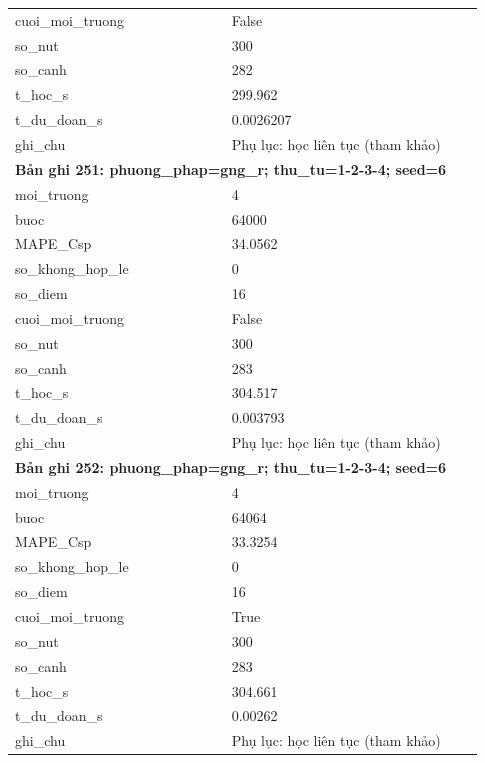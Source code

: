\begin{longtable}{p{0.43\linewidth}p{0.50\linewidth}}
cuoi\_\allowbreak moi\_\allowbreak truong & False \\
so\_\allowbreak nut & 300 \\
so\_\allowbreak canh & 282 \\
t\_\allowbreak hoc\_\allowbreak s & 299.962 \\
t\_\allowbreak du\_\allowbreak doan\_\allowbreak s & 0.0026207 \\
ghi\_\allowbreak chu & Phụ lục: học liên tục (tham khảo) \\
\midrule
\multicolumn{2}{p{0.95\linewidth}}{\textbf{Bản ghi 251: phuong\_phap=gng\_r; thu\_tu=1-2-3-4; seed=6}} \\
moi\_\allowbreak truong & 4 \\
buoc & 64000 \\
MAPE\_\allowbreak Csp & 34.0562 \\
so\_\allowbreak khong\_\allowbreak hop\_\allowbreak le & 0 \\
so\_\allowbreak diem & 16 \\
cuoi\_\allowbreak moi\_\allowbreak truong & False \\
so\_\allowbreak nut & 300 \\
so\_\allowbreak canh & 283 \\
t\_\allowbreak hoc\_\allowbreak s & 304.517 \\
t\_\allowbreak du\_\allowbreak doan\_\allowbreak s & 0.003793 \\
ghi\_\allowbreak chu & Phụ lục: học liên tục (tham khảo) \\
\midrule
\multicolumn{2}{p{0.95\linewidth}}{\textbf{Bản ghi 252: phuong\_phap=gng\_r; thu\_tu=1-2-3-4; seed=6}} \\
moi\_\allowbreak truong & 4 \\
buoc & 64064 \\
MAPE\_\allowbreak Csp & 33.3254 \\
so\_\allowbreak khong\_\allowbreak hop\_\allowbreak le & 0 \\
so\_\allowbreak diem & 16 \\
cuoi\_\allowbreak moi\_\allowbreak truong & True \\
so\_\allowbreak nut & 300 \\
so\_\allowbreak canh & 283 \\
t\_\allowbreak hoc\_\allowbreak s & 304.661 \\
t\_\allowbreak du\_\allowbreak doan\_\allowbreak s & 0.00262 \\
ghi\_\allowbreak chu & Phụ lục: học liên tục (tham khảo) \\

\end{longtable}
